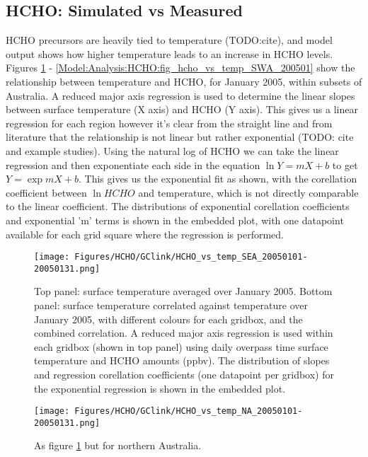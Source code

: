   \subsection{HCHO: Simulated vs Measured}
  \label{Model:Analysis:HCHO}
    
    HCHO precursors are heavily tied to temperature (TODO:cite), and model output shows how higher temperature leads to an increase in HCHO levels.
    Figures \ref{Model:Analysis:HCHO:fig_hcho_vs_temp_SEA_200501} - \ref{Model:Analysis:HCHO:fig_hcho_vs_temp_SWA_200501} show the relationship between temperature and HCHO, for January 2005, within subsets of Australia.
    A reduced major axis regression is used to determine the linear slopes between surface temperature (X axis) and HCHO (Y axis).
    This gives us a linear regression for each region however it's clear from the straight line and from literature that the relationship is not linear but rather exponential (TODO: cite and example studies).
    Using the natural log of HCHO we can take the linear regression and then exponentiate each side in the equation $\ln{Y} = m{X}+b$ to get ${Y} = \exp{m{X}+b}$. 
    This gives us the exponential fit as shown, with the corellation coefficient between $\ln{HCHO}$ and temperature, which is not directly comparable to the linear coefficient.
    The distributions of exponential corellation coefficients and exponential 'm' terms is shown in the embedded plot, with one datapoint available for each grid square where the regression is performed.
    
    
    \begin{figure}
      \texttt{[image: Figures/HCHO/GClink/HCHO\_vs\_temp\_SEA\_20050101-20050131.png]}
      \caption{%
        Top panel: surface temperature averaged over January 2005.
        Bottom panel: surface temperature correlated against temperature over January 2005, with different colours for each gridbox, and the combined correlation. 
        A reduced major axis regression is used within each gridbox (shown in top panel) using daily overpass time surface temperature and HCHO amounts (ppbv).
        The distribution of slopes and regression corellation coefficients (one datapoint per gridbox) for the exponential regression is shown in the embedded plot.
      }
      \label{Model:Analysis:HCHO:fig_hcho_vs_temp_SEA_200501}
    \end{figure}
    
    \begin{figure}
      \texttt{[image: Figures/HCHO/GClink/HCHO\_vs\_temp\_NA\_20050101-20050131.png]}
      \caption{%
        As figure \ref{Model:Analysis:HCHO:fig_hcho_vs_temp_SEA_200501} but for northern Australia.
      }
      \label{Model:Analysis:HCHO:fig_hcho_vs_temp_NA_200501}
    \end{figure}
    
